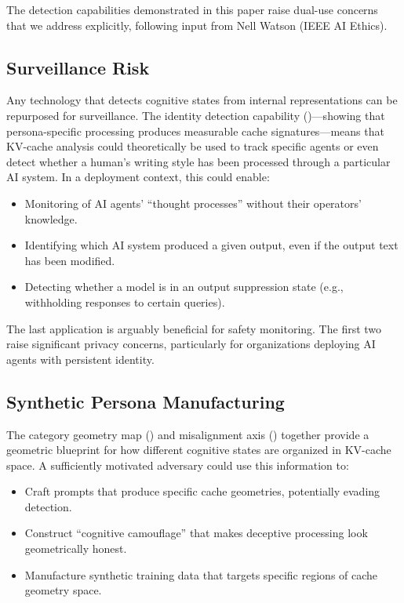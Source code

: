 The detection capabilities demonstrated in this paper raise dual-use concerns that we address explicitly, following input from Nell Watson (IEEE AI Ethics).

\subsection{Surveillance Risk}

Any technology that detects cognitive states from internal representations can be repurposed for surveillance. The identity detection capability ()---showing that persona-specific processing produces measurable cache signatures---means that KV-cache analysis could theoretically be used to track specific agents or even detect whether a human's writing style has been processed through a particular AI system. In a deployment context, this could enable:

\begin{itemize}[leftmargin=*]
    \item Monitoring of AI agents' ``thought processes'' without their operators' knowledge.
    \item Identifying which AI system produced a given output, even if the output text has been modified.
    \item Detecting whether a model is in an output suppression state (e.g., withholding responses to certain queries).
\end{itemize}

The last application is arguably beneficial for safety monitoring. The first two raise significant privacy concerns, particularly for organizations deploying AI agents with persistent identity.

\subsection{Synthetic Persona Manufacturing}

The category geometry map () and misalignment axis () together provide a geometric blueprint for how different cognitive states are organized in KV-cache space. A sufficiently motivated adversary could use this information to:

\begin{itemize}[leftmargin=*]
    \item Craft prompts that produce specific cache geometries, potentially evading detection.
    \item Construct ``cognitive camouflage'' that makes deceptive processing look geometrically honest.
    \item Manufacture synthetic training data that targets specific regions of cache geometry space.
\end{itemize}

